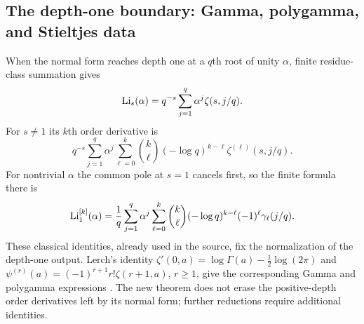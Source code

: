 \subsection{The depth-one boundary: Gamma, polygamma, and Stieltjes data}

When the normal form reaches depth one at a $q$th root of unity
$\alpha$, finite residue-class summation gives
\begin{equation}\label{mixed:DFT}
 \operatorname{Li}_s(\alpha)=q^{-s}\sum_{j=1}^q\alpha^j\zeta(s,j/q).
\end{equation}
For $s\ne1$ its $k$th order derivative is
\begin{equation}\label{mixed:DFTjets}
 q^{-s}\sum_{j=1}^q\alpha^j
  \sum_{\ell=0}^k\binom k\ell(-\log q)^{k-\ell}
                         \zeta^{(\ell)}(s,j/q).
\end{equation}
For nontrivial $\alpha$ the common pole at $s=1$ cancels first,
so the finite formula there is
\begin{equation}\label{mixed:DFTStieltjes}
 \operatorname{Li}_1^{[k]}(\alpha)=\frac1q\sum_{j=1}^q\alpha^j
  \sum_{\ell=0}^k\binom k\ell(-\log q)^{k-\ell}
                         (-1)^\ell\gamma_\ell(j/q).
\end{equation}
These classical identities, already used in the source, fix the
normalization of the depth-one output. Lerch's identity
$\zeta'(0,a)=\log\Gamma(a)-\tfrac12\log(2\pi)$ and
$\psi^{(r)}(a)=(-1)^{r+1}r!\zeta(r+1,a)$, $r\ge1$, give the corresponding
Gamma and polygamma expressions \cite{DLMFHurwitz}. The new theorem
does not erase the positive-depth order derivatives left by its
normal form; further reductions require additional identities.
